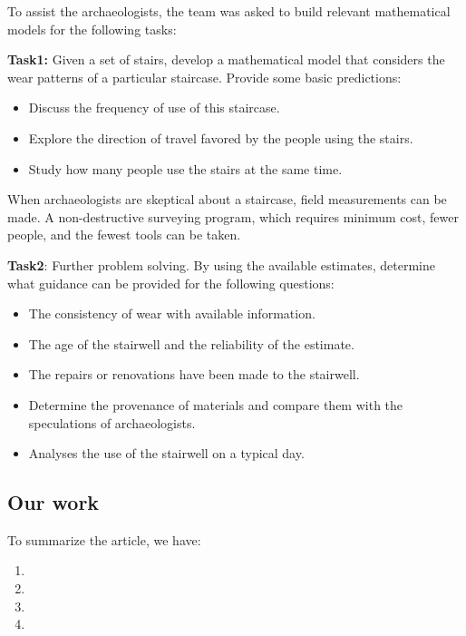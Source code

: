 \documentclass[12pt]{article}  %
\numberwithin{equation}{section} %
\begin{document}
To assist the archaeologists, the team was asked to build relevant mathematical models for the following tasks:

\textbf{Task1:} Given a set of stairs, develop a mathematical model that considers the wear patterns of a particular staircase. Provide some basic predictions:
\begin{itemize}
	\setlength{\parsep}{0ex} %
	\setlength{\topsep}{0ex} %
	\setlength{\itemsep}{0ex} %
	\item Discuss the frequency of use of this staircase.
	\item Explore the direction of travel favored by the people using the stairs.
	\item Study how many people use the stairs at the same time.
\end{itemize}

When archaeologists are skeptical about a staircase, field measurements can be made. A non-destructive surveying program, which requires minimum cost, fewer people, and the fewest tools can be taken.

\textbf{Task2}: Further problem solving. By using the available estimates, determine what guidance can be provided for the following questions:
\begin{itemize}
	\setlength{\parsep}{0ex} %
	\setlength{\topsep}{0ex} %
	\setlength{\itemsep}{0ex} %
	\item The consistency of wear with available information.
	\item The age of the stairwell and the reliability of the estimate.
	\item The repairs or renovations have been made to the stairwell.
    \item Determine the provenance of materials and compare them with the speculations of archaeologists.
    \item Analyses the use of the stairwell on a typical day.
\end{itemize}

\subsection{Our work}
To summarize the article, we have:
\begin{enumerate}[\bfseries (1)]
	\setlength{\parsep}{0ex} %
	\setlength{\topsep}{2ex} %
	\setlength{\itemsep}{1ex} %
	\item 
	\item 
	\item 
	\item 
\end{enumerate}
\end{document}
